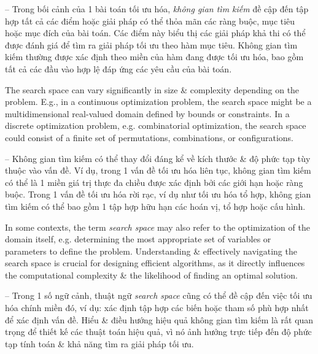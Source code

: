 \documentclass{article}
\begin{document}
-- Trong bối cảnh của 1 bài toán tối ưu hóa, {\it không gian tìm kiếm} đề cập đến tập hợp tất cả các điểm hoặc giải pháp có thể thỏa mãn các ràng buộc, mục tiêu hoặc mục đích của bài toán. Các điểm này biểu thị các giải pháp khả thi có thể được đánh giá để tìm ra giải pháp tối ưu theo hàm mục tiêu. Không gian tìm kiếm thường được xác định theo miền của hàm đang được tối ưu hóa, bao gồm tất cả các đầu vào hợp lệ đáp ứng các yêu cầu của bài toán.

The search space can vary significantly in size \& complexity depending on the problem. E.g., in a continuous optimization problem, the search space might be a multidimensional real-valued domain defined by bounds or constraints. In a discrete optimization problem, e.g. combinatorial optimization, the search space could consist of a finite set of permutations, combinations, or configurations.

-- Không gian tìm kiếm có thể thay đổi đáng kể về kích thước \& độ phức tạp tùy thuộc vào vấn đề. Ví dụ, trong 1 vấn đề tối ưu hóa liên tục, không gian tìm kiếm có thể là 1 miền giá trị thực đa chiều được xác định bởi các giới hạn hoặc ràng buộc. Trong 1 vấn đề tối ưu hóa rời rạc, ví dụ như tối ưu hóa tổ hợp, không gian tìm kiếm có thể bao gồm 1 tập hợp hữu hạn các hoán vị, tổ hợp hoặc cấu hình.

In some contexts, the term {\it search space} may also refer to the optimization of the domain itself, e.g. determining the most appropriate set of variables or parameters to define the problem. Understanding \& effectively navigating the search space is crucial for designing efficient algorithms, as it directly influences the computational complexity \& the likelihood of finding an optimal solution.

-- Trong 1 số ngữ cảnh, thuật ngữ {\it search space} cũng có thể đề cập đến việc tối ưu hóa chính miền đó, ví dụ: xác định tập hợp các biến hoặc tham số phù hợp nhất để xác định vấn đề. Hiểu \& điều hướng hiệu quả không gian tìm kiếm là rất quan trọng để thiết kế các thuật toán hiệu quả, vì nó ảnh hưởng trực tiếp đến độ phức tạp tính toán \& khả năng tìm ra giải pháp tối ưu.

\end{document}
